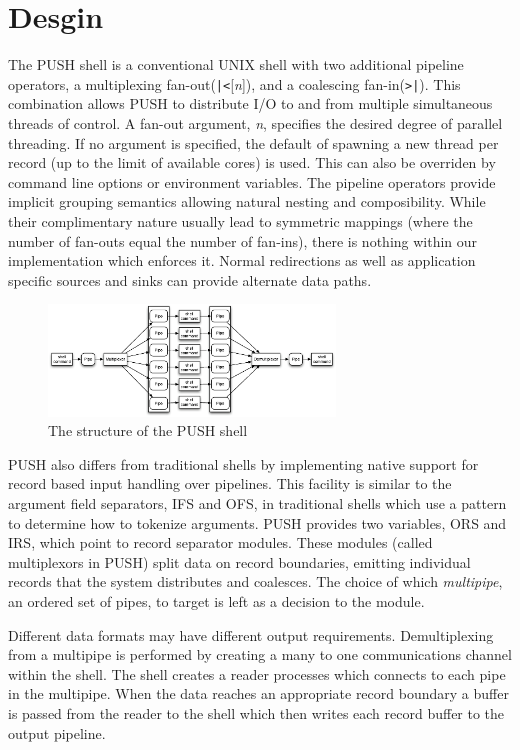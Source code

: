 \section{Desgin}

The PUSH shell is a conventional UNIX shell with 
two additional pipeline operators, a multiplexing 
fan-out(\verb!|<![\emph{n}]), and a coalescing fan-in(\verb!>|!).
This combination allows PUSH to distribute I/O to and from multiple
simultaneous threads of control.
A fan-out argument, \emph{n}, specifies the desired degree of parallel
threading.  If no argument is specified, the default of spawning a new
thread per record (up to the limit of available cores) is used.  This can
also be overriden by command line options or environment variables.
The pipeline operators provide implicit grouping semantics allowing natural
nesting and composibility.
While their complimentary nature usually lead to symmetric
mappings (where the number of fan-outs equal the number of fan-ins), there is
nothing within our implementation which enforces it.
Normal redirections as well as application specific sources and sinks
can provide alternate data paths.

\begin{figure}[htp]
\centering
\includegraphics[width=3in]{pipestruct.eps}
\caption{The structure of the PUSH shell}
\label{fig:pipestruct}
\end{figure}

PUSH also differs from traditional shells by implementing native support for
record based input handling over pipelines. This facility is similar to the
argument field separators, IFS and OFS, in traditional shells which use a
pattern to determine how to tokenize arguments. PUSH provides two variables,
ORS and IRS, which point to record separator modules. These modules
(called multiplexors in PUSH) split data on record boundaries, emitting
individual records that the system distributes and coalesces.
The choice of which \emph{multipipe}, an ordered set of pipes, to target is
left as a decision to the module.

Different data formats may have different output requirements.  
Demultiplexing from a multipipe is performed by creating a many to one
communications channel within the shell. The shell creates a reader processes
which connects to each pipe in the multipipe. When the data reaches an
appropriate record boundary a buffer is passed from the reader to the shell
which then writes each record buffer to the output pipeline.

